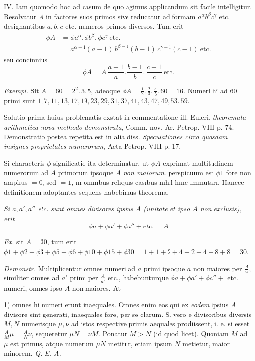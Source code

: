 IV. Iam quomodo hoc ad casum de quo agimus applicandum sit facile intelligitur. Resolvatur $A$ in factores suos primos sive reducatur ad formam $a^\alpha b^\beta c^\gamma$ etc. designantibus $a,b,c$ etc. numeros primos diversos. Tum erit
\[
\begin{aligned}
\phi A&=\phi a^\alpha.\,\phi b^\beta.\,\phi c^\gamma\ \mathrm{etc.}\\
&=a^{\alpha-1}(a-1)\,b^{\beta-1}(b-1)\,c^{\gamma-1}(c-1)\ \mathrm{etc.}
\end{aligned}
\]
seu concinnius
\[\phi A=A\,\frac{a-1}{a}.\,\frac{b-1}{b}.\,\frac{c-1}{c}\ \mathrm{etc.}\]

\emph{Exempl.} Sit $A=60=2^2.\,3.\,5$, adeoque $\phi A=\frac{1}{2}.\,\frac{2}{3}.\,\frac{4}{5}.\,60=16$. Numeri hi ad $60$ primi sunt $1,7,11,13,17,19,23,29,31,37,41,43,47,49,53.\,59.$

Solutio prima huius problematis exstat in commentatione ill. Euleri, \emph{theoremata arithmetica nova methodo demonstrata}, Comm. nov. Ac. Petrop. VIII p. 74. Demonstratio postea repetita est in alia diss. \emph{Speculationes circa quasdam insignes proprietates numerorum}, Acta Petrop. VIII p. 17.

Si characteris $\phi$ significatio ita determinatur, ut $\phi A$ exprimat multitudinem numerorum ad $A$ primorum ipsoque $A$ \emph{non maiorum}. perspicuum est $\phi1$ fore non amplius $=0$, sed $=1$, in omnibus reliquis casibus nihil hinc immutari. Hancce definitionem adoptantes sequens habebimus theorema.

\emph{Si $a,a',a''$ etc. sunt omnes divisores ipsius $A$ (unitate et ipso $A$ non exclusis), erit}
\[\phi a+\phi a'+\phi a''+\textit{etc.}=A\]

\emph{Ex.} sit $A=30$, tum erit $\phi1+\phi2+\phi3+\phi5+\phi6+\phi10+\phi15+\phi30=1+1+2+4+2+4+8+8=30$.

\emph{Demonstr.} Multiplicentur omnes numeri ad $a$ primi ipsoque $a$ non maiores per $\frac{A}{a}$, similiter omnes ad $a'$ primi per $\frac{A}{a'}$ etc., habebunturque $\phi a+\phi a'
+\phi a''+$ etc. numeri, omnes ipso $A$ non maiores. At

1) omnes hi numeri erunt inaequales. Omnes enim eos qui ex \emph{eodem} ipsius $A$ divisore sint generati, inaequales fore, per se clarum. Si vero e divisoribus diversis $M,N$ numerisque $\mu,\nu$ ad istos respective primis aequales prodiissent, i. e. si esset $\frac{A}{M}\mu=\frac{A}{N}\nu$, sequeretur $\mu N=\nu M$. Ponatur $M>N$ (id quod licet). Quoniam $M$ ad $\mu$ est primus, atque numerum $\mu N$ metitur, etiam ipsum $N$ metietur, maior minorem. \emph{Q. E. A.}

